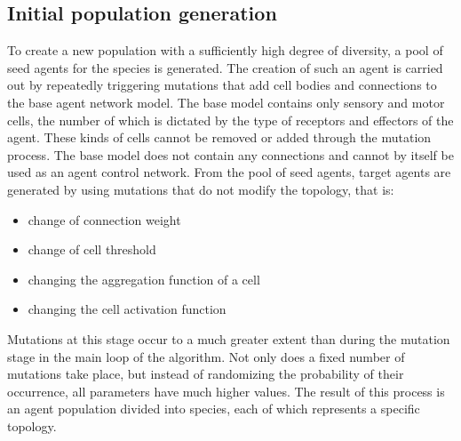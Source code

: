 \subsection{Initial population generation}
To create a new population with a sufficiently high degree of diversity, a pool of seed agents 
for the species is generated. 
The creation of such an agent is carried out by repeatedly triggering mutations that add cell 
bodies and connections to the base agent network model.
The base model contains only sensory and motor cells, the number of which is dictated by the 
type of receptors and effectors of the agent. 
These kinds of cells cannot be removed or added through the mutation process. 
The base model does not contain any connections and cannot by itself be used as an agent 
control network.
From the pool of seed agents, target agents are generated by using mutations that do not 
modify the topology, that is:
\begin{itemize}
	\item change of connection weight
	\item change of cell threshold
	\item changing the aggregation function of a cell
	\item changing the cell activation function
\end{itemize}
Mutations at this stage occur to a much greater extent than during the mutation stage in the 
main loop of the algorithm. 
Not only does a fixed number of mutations take place, but instead of randomizing the probability 
of their occurrence, all parameters have much higher values.
The result of this process is an agent population divided into species, each of which 
represents a specific topology.

\FloatBarrier
